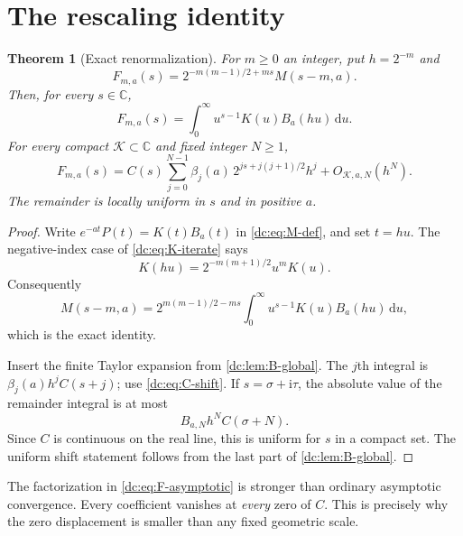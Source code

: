\documentclass[11pt,a4paper,oneside,openany]{book}
\numberwithin{equation}{chapter}
\newtheorem{theorem}{Theorem}[chapter]
\theoremstyle{definition}
\theoremstyle{remark}
\newcommand{\C}{\mathbb C}
\newcommand{\dd}{\,\mathrm d}
\newcommand{\ii}{\mathrm i}
\begin{document}
\section{The rescaling identity}
\begin{theorem}[Exact renormalization]
\label{dc:thm:rescaling}
For $m\ge0$ an integer, put $h=2^{-m}$ and
\begin{equation}
 F_{m,a}(s)=2^{-m(m-1)/2+ms}M(s-m,a).
 \label{dc:eq:F-def}
\end{equation}
Then, for every $s\in\C$,
\begin{equation}
 \boxed{F_{m,a}(s)=\int_0^\infty u^{s-1}K(u)B_a(hu)\dd u.}
 \label{dc:eq:F-exact}
\end{equation}
For every compact $\mathcal K\subset\C$ and fixed integer $N\ge1$,
\begin{equation}
 \boxed{
 F_{m,a}(s)=C(s)\sum_{j=0}^{N-1}
  \beta_j(a)\,2^{js+j(j+1)/2}h^j
  +O_{\mathcal K,a,N}(h^N).}
 \label{dc:eq:F-asymptotic}
\end{equation}
The remainder is locally uniform in $s$ and in positive $a$.
\end{theorem}
\begin{proof}
Write $e^{-at}P(t)=K(t)B_a(t)$ in \cref{dc:eq:M-def}, and set $t=hu$.
The negative-index case of \cref{dc:eq:K-iterate} says
\[
 K(hu)=2^{-m(m+1)/2}u^mK(u).
\]
Consequently
\[
 M(s-m,a)=2^{m(m-1)/2-ms}
       \int_0^\infty u^{s-1}K(u)B_a(hu)\dd u,
\]
which is the exact identity.

Insert the finite Taylor expansion from \cref{dc:lem:B-global}. The
$j$th integral is $\beta_j(a)h^jC(s+j)$; use
\cref{dc:eq:C-shift}. If $s=\sigma+\ii\tau$, the absolute value of the
remainder integral is at most
\begin{equation}
 B_{a,N}h^N C(\sigma+N).
 \label{dc:eq:F-remainder-explicit}
\end{equation}
Since $C$ is continuous on the real line, this is uniform for $s$ in
a compact set. The uniform shift statement follows from the last
part of \cref{dc:lem:B-global}.
\end{proof}

The factorization in \cref{dc:eq:F-asymptotic} is stronger than ordinary
asymptotic convergence. Every coefficient vanishes at \emph{every}
zero of $C$. This is precisely why the zero displacement is smaller
than any fixed geometric scale.
\end{document}
